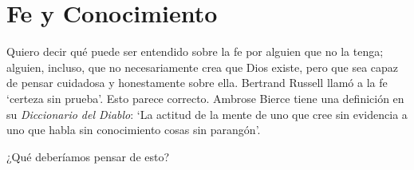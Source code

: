 \section{Fe y Conocimiento}

Quiero decir qué puede ser entendido sobre la fe por alguien que no la tenga; alguien, incluso, que no necesariamente crea que Dios existe, pero que sea capaz de pensar cuidadosa y honestamente sobre ella. Bertrand Russell llamó a la fe `certeza sin prueba'. Esto parece correcto. Ambrose Bierce tiene una definición en su \emph{Diccionario del Diablo}: `La actitud de la mente de uno que cree sin evidencia a uno que habla sin conocimiento cosas sin parangón'.

¿Qué deberíamos pensar de esto?
